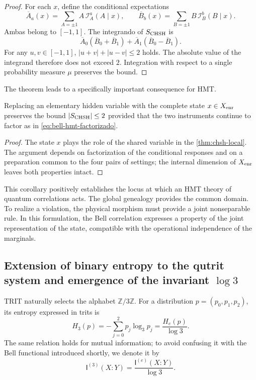 \begin{proof}
For each \(x\), define the conditional expectations
\[
 \overline A_a(x)=\sum_{A=\pm1}A\,\mathcal I_A^a(A\mid x),
 \qquad
 \overline B_b(x)=\sum_{B=\pm1}B\,\mathcal I_B^b(B\mid x).
\]
Ambas belong to \([-1,1]\). The integrando of
\(S_{\rm CHSH}\) is
\[
 \overline A_0(\overline B_0+\overline B_1)
 +\overline A_1(\overline B_0-\overline B_1).
\]
For any \(u,v\in[-1,1]\),
\(\lvert u+v\rvert+\lvert u-v\rvert\leq2\) holds. The absolute value of the
integrand therefore does not exceed \(2\). Integration with respect to a single
probability measure \(\mu\) preserves the bound.
\end{proof}

The theorem leads to a specifically important consequence for HMT.

\begin{corollary}
\label{cor:no-go-bell-memoria}
Replacing an elementary hidden variable with the complete state
\(x\in X_{\rm enr}\) preserves the bound
\(\lvert S_{\rm CHSH}\rvert\leq2\) provided that the two instruments continue to
factor as in \eqref{eq:bell-hmt-factorizado}.
\end{corollary}

\begin{proof}
The state \(x\) plays the role of the shared variable in the
\cref{thm:chsh-local}. The argument depends on factorization of the conditional
responses and on a preparation common to the four pairs of settings; the internal
dimension of \(X_{\rm enr}\) leaves both properties intact.
\end{proof}

This corollary positively establishes the locus at which an HMT theory of
quantum correlations acts. The global genealogy provides the common domain. To
realize a violation, the physical morphism must provide a joint
nonseparable rule. In this formulation, the Bell correlation expresses a property of the
joint representation of the state, compatible with the operational independence of
the marginals.

\subsection{Extension of binary entropy to the qutrit system and emergence of the invariant \(\log 3\)}

TRIT naturally selects the alphabet
\(\mathbb Z/3\mathbb Z\). For a distribution
\(p=(p_0,p_1,p_2)\), its entropy expressed in trits is
\begin{equation}
 H_3(p)=-\sum_{j=0}^{2}p_j\log_3p_j
       =\frac{H_e(p)}{\log 3}.
 \label{eq:entropia-base-tres}
\end{equation}
The same relation holds for mutual information; to avoid confusing it with the
Bell functional introduced shortly, we denote it by
\[
 \mathsf I^{(3)}(X:Y)
 =\frac{\mathsf I^{(e)}(X:Y)}{\log 3}.
\]

